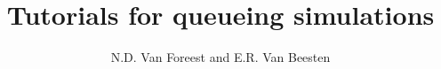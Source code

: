 \newenvironment{pynotangle}
    {\pyverbatim
    }
    {\endgraf\endpyverbatim
    }


\title{Tutorials for queueing simulations}
\author{N.D. Van Foreest and E.R. Van Beesten}


\maketitle

\tableofcontents

\clearpage


 \clearpage
 \clearpage
 \clearpage
 \clearpage
 \clearpage
\clearpage

\clearpage
{}\clearpage







